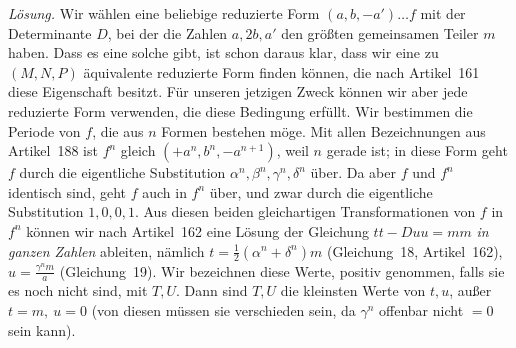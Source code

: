 \textit{Lösung.} Wir wählen eine beliebige reduzierte Form \((a,b,-a')\ldots f\) mit der Determinante \(D\), bei der die Zahlen \(a,2b,a'\) den größten gemeinsamen Teiler \(m\) haben. Dass es eine solche gibt, ist schon daraus klar, dass wir eine zu \((M,N,P)\) äquivalente reduzierte Form finden können, die nach Artikel~161 diese Eigenschaft besitzt. Für unseren jetzigen Zweck können wir aber jede reduzierte Form verwenden, die diese Bedingung erfüllt. Wir bestimmen die Periode von \(f\), die aus \(n\) Formen bestehen möge. Mit allen Bezeichnungen aus Artikel~188 ist \(f^n\) gleich \((+a^n,b^n,-a^{n+1})\), weil \(n\) gerade ist; in diese Form geht \(f\) durch die eigentliche Substitution \(\alpha^n,\beta^n,\gamma^n,\delta^n\) über. Da aber \(f\) und \(f^n\) identisch sind, geht \(f\) auch in \(f^n\) über, und zwar durch die eigentliche Substitution \(1,0,0,1\). Aus diesen beiden gleichartigen Transformationen von \(f\) in \(f^n\) können wir nach Artikel~162 eine Lösung der Gleichung \(tt-Duu=mm\) \textit{in ganzen Zahlen} ableiten, nämlich \(t=\frac12(\alpha^n+\delta^n)m\) (Gleichung~18, Artikel~162), \(u=\frac{\gamma^n m}{a}\) (Gleichung~19). Wir bezeichnen diese Werte, positiv genommen, falls sie es noch nicht sind, mit \(T,U\). Dann sind \(T,U\) die kleinsten Werte von \(t,u\), außer \(t=m,\ u=0\) (von diesen müssen sie verschieden sein, da \(\gamma^n\) offenbar nicht \(=0\) sein kann).

